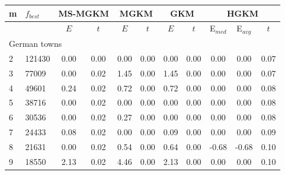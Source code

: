 {\footnotesize
\centering
\begin{longtable}{@{}llccccccccc@{}}
\hline
\multicolumn{1}{l|}{m}  & \multicolumn{1}{l|}{$f_{best}$} & \multicolumn{2}{c|}{MS-MGKM}     & \multicolumn{2}{c|}{MGKM}        & \multicolumn{2}{c|}{GKM}         & \multicolumn{3}{c}{HGKM}     \\ \hline
                        & \multicolumn{1}{l|}{}           & $E$  & \multicolumn{1}{c|}{$t$}   & $E$   & \multicolumn{1}{c|}{$t$}  & $E$  & \multicolumn{1}{c|}{$t$}  & E$_{med}$ & E$_{avg}$ & $t$  \\ \hline
\multicolumn{11}{l}{German towns}                                                                                                                                                                 \\ \hline
\multicolumn{1}{l|}{2}  & \multicolumn{1}{l|}{121430}     & 0.00 & \multicolumn{1}{c|}{0.00} & 0.00 & \multicolumn{1}{c|}{0.00} & 0.00 & \multicolumn{1}{c|}{0.00} & 0.00      & 0.00      & 0.07 \\
\multicolumn{1}{l|}{3}  & \multicolumn{1}{l|}{77009}      & 0.00 & \multicolumn{1}{c|}{0.02} & 1.45 & \multicolumn{1}{c|}{0.00} & 1.45 & \multicolumn{1}{c|}{0.00} & 0.00      & 0.00      & 0.07 \\
\multicolumn{1}{l|}{4}  & \multicolumn{1}{l|}{49601}      & 0.24 & \multicolumn{1}{c|}{0.02} & 0.72 & \multicolumn{1}{c|}{0.00} & 0.72 & \multicolumn{1}{c|}{0.00} & 0.00      & 0.00      & 0.08 \\
\multicolumn{1}{l|}{5}  & \multicolumn{1}{l|}{38716}      & 0.00 & \multicolumn{1}{c|}{0.02} & 0.00 & \multicolumn{1}{c|}{0.00} & 0.00 & \multicolumn{1}{c|}{0.00} & 0.00      & 0.00      & 0.08 \\
\multicolumn{1}{l|}{6}  & \multicolumn{1}{l|}{30536}      & 0.00 & \multicolumn{1}{c|}{0.02} & 0.27 & \multicolumn{1}{c|}{0.00} & 0.00 & \multicolumn{1}{c|}{0.00} & 0.00      & 0.00      & 0.08 \\
\multicolumn{1}{l|}{7}  & \multicolumn{1}{l|}{24433}      & 0.08 & \multicolumn{1}{c|}{0.02} & 0.00 & \multicolumn{1}{c|}{0.00} & 0.09 & \multicolumn{1}{c|}{0.00} & 0.00      & 0.00      & 0.09 \\
\multicolumn{1}{l|}{8}  & \multicolumn{1}{l|}{21631}      & 0.00 & \multicolumn{1}{c|}{0.02} & 0.54 & \multicolumn{1}{c|}{0.00} & 0.64 & \multicolumn{1}{c|}{0.00} & -0.68     & -0.68     & 0.10 \\
\multicolumn{1}{l|}{9}  & \multicolumn{1}{l|}{18550}      & 2.13 & \multicolumn{1}{c|}{0.02} & 4.46 & \multicolumn{1}{c|}{0.00} & 2.13 & \multicolumn{1}{c|}{0.00} & 0.00      & 0.00      & 0.10 \\

\end{longtable}}

